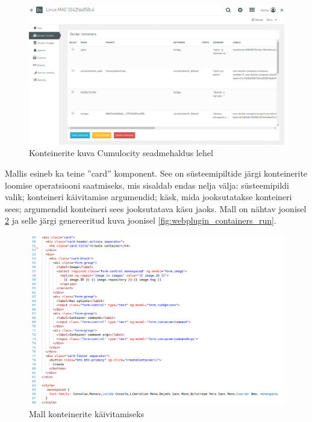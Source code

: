 \documentclass[12pt]{article}
\begin{document}
  \FloatBarrier
 
  \begin{figure} [ht] %
  \begin{center}
  \includegraphics[width=1\textwidth]{webplugin_containers_table}
  \caption{Konteinerite kuva Cumulocity seadmehaldus lehel}
  \label{fig:webplugin_containers_table}
  \end{center}
  \end{figure}
  
  \FloatBarrier
 
  Mallis esineb ka teine ''card'' komponent. See on süsteemipiltide järgi konteinerite
  loomise operatsiooni saatmiseks, mis sisaldab endas nelja välja:
  süsteemipildi valik; konteineri käivitamise argumendid; käsk, mida jooksutatakse
  konteineri sees; argumendid konteineri sees jooksutatava käsu jaoks. Mall on
  nähtav joonisel \ref{fig:webplugin_containers_run_template} ja selle järgi 
  genereeritud kuva joonisel \ref{fig:webplugin_containers_run}.
  
  \begin{figure} [ht] %
  \begin{center}
  \includegraphics[width=1\textwidth]{webplugin_containers_run_template}
  \caption{Mall konteinerite käivitamiseks}
  \label{fig:webplugin_containers_run_template}
  \end{center}
  \end{figure}
  
\end{document}
